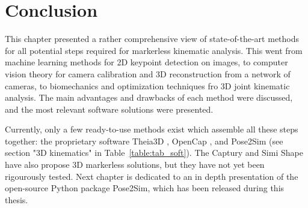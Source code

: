 \newpage

\section{Conclusion}

This chapter presented a rather comprehensive view of state-of-the-art methods for all potential steps required for markerless kinematic analysis. This went from machine learning methods for 2D keypoint detection on images, to computer vision theory for camera calibration and 3D reconstruction from a network of cameras, to biomechanics and optimization techniques fro 3D joint kinematic analysis. The main advantages and drawbacks of each method were discussed, and the most relevant software solutions were presented. 

Currently, only a few ready-to-use methods exist which assemble all these steps together: the proprietary software Theia3D \cite{Kanko2021b}, OpenCap \cite{Uhlrich2022}, and Pose2Sim \cite{Pagnon2022b} (see section "3D kinematics" in Table~\ref{table:tab_soft}). The Captury and Simi Shape have also propose 3D markerless solutions, but they have not yet been rigourously tested. Next chapter is dedicated to an in depth presentation of the open-source Python package Pose2Sim, which has been released during this thesis. 






























